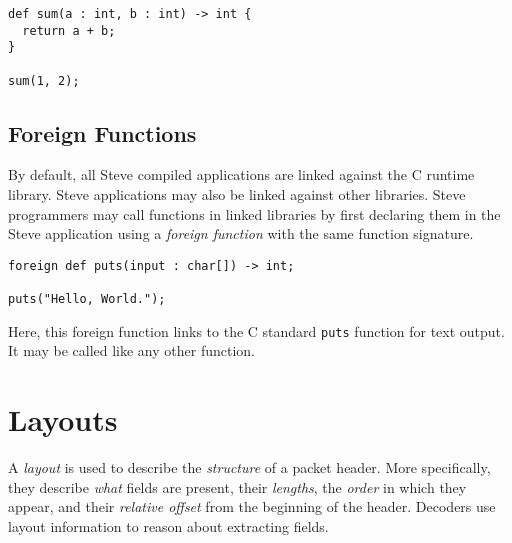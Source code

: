 \begin{codepage}
\begin{lstlisting}
def sum(a : int, b : int) -> int {
  return a + b;
}

sum(1, 2);
\end{lstlisting}
\end{codepage}

\subsection{Foreign Functions} \label{tut:foreign}

By default, all Steve compiled applications are linked against the C runtime
library. Steve applications may also be linked against other libraries.
Steve programmers may call functions in linked libraries by first declaring
them in the Steve application using a \emph{foreign function} with the same
function signature.

\begin{codepage}
\begin{lstlisting}
foreign def puts(input : char[]) -> int;

puts("Hello, World.");
\end{lstlisting}
\end{codepage}

Here, this foreign function links to the C standard \texttt{puts} function
for text output. It may be called like any other function.

\section{Layouts} \label{tut:layout}

A \textit{layout} is used to describe 
the \textit{structure} of a packet header.
More specifically, they describe \textit{what} fields are present, their
\textit{lengths}, the \textit{order} in which they appear, and their
\textit{relative offset} from the beginning of the header. 
Decoders use layout information to reason about extracting fields.


